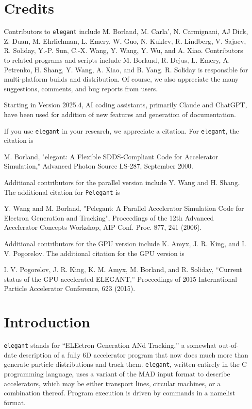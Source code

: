 \documentclass[11pt]{article}
\begin{document}
\section{Credits}

Contributors to {\tt elegant} include M. Borland, M. Carla', N. Carmignani, AJ Dick, Z. Duan, M. Ehrlichman, L. Emery, W. Guo, 
N. Kuklev, R. Lindberg, V. Sajaev, R. Soliday, Y.-P. Sun, C.-X. Wang, Y. Wang, Y. Wu, and A. Xiao.
Contributors to related programs and scripts include M. Borland, R. Dejus, L. Emery, A. Petrenko, H. Shang, Y. Wang, 
A. Xiao, and B. Yang.
R. Soliday is responsible for multi-platform builds and distribution.
Of course, we also appreciate the many suggestions, comments, and bug reports from users.

Starting in Version 2025.4, AI coding assistants, primarily Claude and ChatGPT, have been used for addition of new
features and generation of documentation.

If you use {\tt elegant} in your research, we appreciate a citation. For {\tt elegant}, the citation is
\begin{flushleft}
M. Borland, "elegant: A Flexible SDDS-Compliant Code for Accelerator Simulation," Advanced Photon Source LS-287, September 2000.
\end{flushleft}

Additional contributors for the parallel version include Y. Wang and H. Shang.
The additional citation for {\tt Pelegant} is
\begin{flushleft}
Y. Wang and M. Borland, "Pelegant: A Parallel Accelerator Simulation Code for Electron Generation and Tracking", Proceedings of the 12th Advanced Accelerator
Concepts Workshop, AIP Conf. Proc. 877, 241 (2006).
\end{flushleft}

Additional contributors for the GPU version include K. Amyx, J. R. King, and I. V. Pogorelov. 
The additional citation for the GPU version is
\begin{flushleft}
I. V. Pogorelov, J. R. King, K. M. Amyx, M. Borland, and R. Soliday, ``Current status of the GPU-accelerated ELEGANT,''
Proceedings of 2015 International Particle Accelerator Conference, 623 (2015).
\end{flushleft}

\section{Introduction}

{\tt elegant} stands for ``ELEctron Generation ANd Tracking,'' a
somewhat out-of-date description of a fully 6D accelerator program
that now does much more than generate particle distributions and track
them.  {\tt elegant}, written entirely in the C programming
language\cite{Kernighan}, uses a variant of the MAD\cite{MAD} input
format to describe accelerators, which may be either transport lines,
circular machines, or a combination thereof.  Program execution is
driven by commands in a namelist format.
\end{document}
